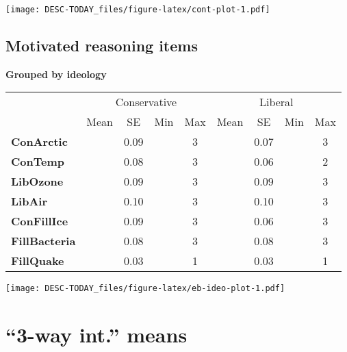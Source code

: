 \documentclass[
]{article}
\begin{document}
\texttt{[image: DESC-TODAY\_files/figure-latex/cont-plot-1.pdf]}

\hypertarget{motivated-reasoning-items}{%
\subsection{Motivated reasoning items}\label{motivated-reasoning-items}}

\textbf{Grouped by ideology}

\begin{tabular}{>{}l||>{}c|c|>{}c|>{}c||>{}c|c|>{}c|c}
\hline
\multicolumn{1}{c|}{ } & \multicolumn{4}{c|}{Conservative} & \multicolumn{4}{c}{Liberal} \\
\cline{2-5} \cline{6-9}
  & Mean & SE & Min & Max & Mean & SE & Min & Max\\
\hline
\textbf{ConArctic} & \cellcolor{lightgray}{-1.07} & 0.09 & \cellcolor{lightgray}{-3} & 3 & \cellcolor{lightgray}{-1.73} & 0.07 & \cellcolor{lightgray}{-3} & 3\\
\hline
\textbf{ConTemp} & \cellcolor{lightgray}{-1.37} & 0.08 & \cellcolor{lightgray}{-3} & 3 & \cellcolor{lightgray}{-1.97} & 0.06 & \cellcolor{lightgray}{-3} & 2\\
\hline
\textbf{LibOzone} & \cellcolor{lightgray}{-0.32} & 0.09 & \cellcolor{lightgray}{-3} & 3 & \cellcolor{lightgray}{-0.21} & 0.09 & \cellcolor{lightgray}{-3} & 3\\
\hline
\textbf{LibAir} & \cellcolor{lightgray}{-0.85} & 0.10 & \cellcolor{lightgray}{-3} & 3 & \cellcolor{lightgray}{-0.81} & 0.10 & \cellcolor{lightgray}{-3} & 3\\
\hline
\textbf{ConFillIce} & \cellcolor{lightgray}{-1.83} & 0.09 & \cellcolor{lightgray}{-3} & 3 & \cellcolor{lightgray}{-2.33} & 0.06 & \cellcolor{lightgray}{-3} & 3\\
\hline
\textbf{FillBacteria} & \cellcolor{lightgray}{-0.16} & 0.08 & \cellcolor{lightgray}{-3} & 3 & \cellcolor{lightgray}{-0.35} & 0.08 & \cellcolor{lightgray}{-3} & 3\\
\hline
\textbf{FillQuake} & \cellcolor{lightgray}{0.29} & 0.03 & \cellcolor{lightgray}{0} & 1 & \cellcolor{lightgray}{0.33} & 0.03 & \cellcolor{lightgray}{0} & 1\\
\hline
\end{tabular}

\texttt{[image: DESC-TODAY\_files/figure-latex/eb-ideo-plot-1.pdf]}

\hypertarget{way-int.-means}{%
\section{``3-way int.'' means}\label{way-int.-means}}
\end{document}
